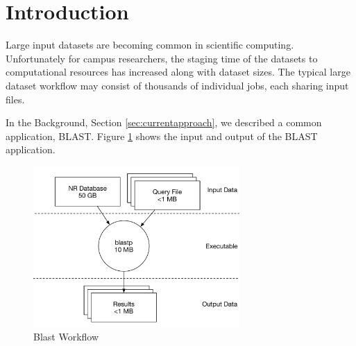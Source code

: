 \label{chapter:campusdatadistribution}






%




\section{Introduction}

Large input datasets are becoming common in scientific computing.  Unfortunately for campus researchers, the staging time of the datasets to computational resources has increased along with dataset sizes.  The typical large dataset workflow may consist of thousands of individual jobs, each sharing input files.

In the Background, Section \ref{sec:currentapproach}, we described a common application, BLAST.  Figure \ref{fig:blastworkflowdata} shows the input and output of the BLAST application.

\begin{figure}
	\centering
	\includegraphics[width=0.7\textwidth]{images/BlastWorkflow}
	\caption{Blast Workflow}
	\label{fig:blastworkflowdata}
\end{figure}

